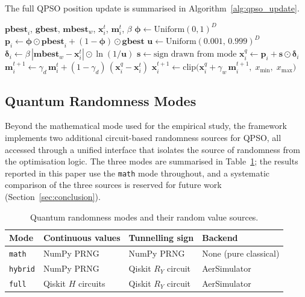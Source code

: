 The full QPSO position update is summarised in
Algorithm~\ref{alg:qpso_update}.

\begin{algorithm}[t]
\caption{QPSO position update for particle $i$ at iteration $t$.}
\label{alg:qpso_update}
\begin{algorithmic}[1]
\Require $\mathbf{pbest}_i$, $\mathbf{gbest}$, $\mathbf{mbest}_w$,
         $\mathbf{x}_i^t$, $\mathbf{m}_i^t$, $\beta$
\State $\boldsymbol{\phi} \leftarrow \text{Uniform}(0,1)^D$
\State $\mathbf{p}_i \leftarrow \boldsymbol{\phi} \odot \mathbf{pbest}_i
       + (1 - \boldsymbol{\phi}) \odot \mathbf{gbest}$
\State $\mathbf{u} \leftarrow \text{Uniform}(0.001,\, 0.999)^D$
\State $\boldsymbol{\delta}_i \leftarrow \beta\,
       |\mathbf{mbest}_w - \mathbf{x}_i^t| \odot
       \ln(1/\mathbf{u})$
\State $\mathbf{s} \leftarrow \text{sign drawn from mode}$
\State $\mathbf{x}_i^{q} \leftarrow \mathbf{p}_i
       + \mathbf{s} \odot \boldsymbol{\delta}_i$
\State $\mathbf{m}_i^{t+1} \leftarrow \gamma_d\,\mathbf{m}_i^t
       + (1 - \gamma_d)\,(\mathbf{x}_i^{q} - \mathbf{x}_i^t)$
\State $\mathbf{x}_i^{t+1} \leftarrow \text{clip}\bigl(
       \mathbf{x}_i^{q} + \gamma_w\,\mathbf{m}_i^{t+1},\;
       x_{\min},\; x_{\max}\bigr)$
\end{algorithmic}
\end{algorithm}


\subsection{Quantum Randomness Modes}
\label{sec:meth:modes}

Beyond the mathematical mode used for the empirical study, the framework
implements two additional circuit-based randomness sources for QPSO, all
accessed through a unified interface that isolates the source of randomness from
the optimisation logic.  The three modes are summarised in
Table~\ref{tab:modes}; the results reported in this paper use the \texttt{math}
mode throughout, and a systematic comparison of the three sources is reserved
for future work (Section~\ref{sec:conclusion}).

\begin{table}[t]
\centering
\caption{Quantum randomness modes and their random value sources.}
\label{tab:modes}
\begin{tabular}{llll}
\toprule
\textbf{Mode} & \textbf{Continuous values}
  & \textbf{Tunnelling sign}
  & \textbf{Backend} \\
\midrule
\texttt{math}   & NumPy PRNG   & NumPy PRNG
  & None (pure classical) \\
\texttt{hybrid} & NumPy PRNG   & Qiskit $R_Y$ circuit
  & AerSimulator \\
\texttt{full}   & Qiskit $H$ circuits & Qiskit $R_Y$ circuit
  & AerSimulator \\
\bottomrule
\end{tabular}
\end{table}

